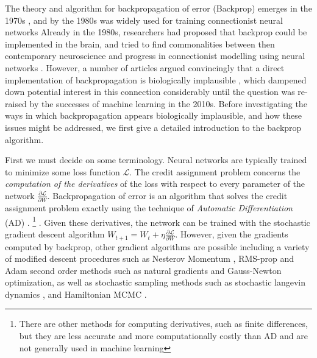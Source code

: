 The theory and algorithm for backpropagation of error (Backprop) emerges in the 1970s \citep{linnainmaa1970representation}, and by the 1980s was widely used for training connectionist neural networks \citep{rumelhart1985feature,rumelhart1986learning,griewank1989automatic} Already in the 1980s, researchers had proposed that backprop could be implemented in the brain, and tried to find commonalities between then contemporary neuroscience and progress in connectionist modelling using neural networks \citep{rumelhart1986learning}. However, a number of articles argued convincingly that a direct implementation of backpropagation is biologically implausible \citep{crick1989recent}, which dampened down potential interest in this connection considerably until the question was re-raised by the successes of machine learning in the 2010s. Before investigating the ways in which backpropagation appears biologically implausible, and how these issues might be addressed, we first give a detailed introduction to the backprop algorithm.

First we must decide on some terminology. Neural networks are typically trained to minimize some loss function $\mathcal{L}$. 
The credit assignment problem concerns the \emph{computation of the derivatives} of the loss with respect to every parameter of the network $\frac{\partial \mathcal{L}}{\partial W}$. Backpropagation of error is an algorithm that solves the credit assignment problem exactly using the technique of \emph{Automatic Differentiation} (AD) \citep{griewank1989automatic,baydin2017automatic,van2018automatic,paszke2017automatic}. \footnote{There are other methods for computing derivatives, such as finite differences, but they are less accurate and more computationally costly than AD and are not generally used in machine learning} . Given these derivatives, the network can be trained with the stochastic gradient descent algorithm $W_{t+1} = W_t + \eta \frac{\partial \mathcal{L}}{\partial W}$. However, given the gradients computed by backprop, other gradient algorithms are possible including a variety of modified descent procedures such as Nesterov Momentum \citep{nesterov27method}, RMS-prop \citep{hinton2012neural} and Adam \citep{kingma2014adam} second order methods such as natural gradients \citep{amari1995information} and Gauss-Newton optimization, as well as stochastic sampling methods such as stochastic langevin dynamics \citep{welling2011bayesian}, and Hamiltonian MCMC \citep{neal2011mcmc}.

